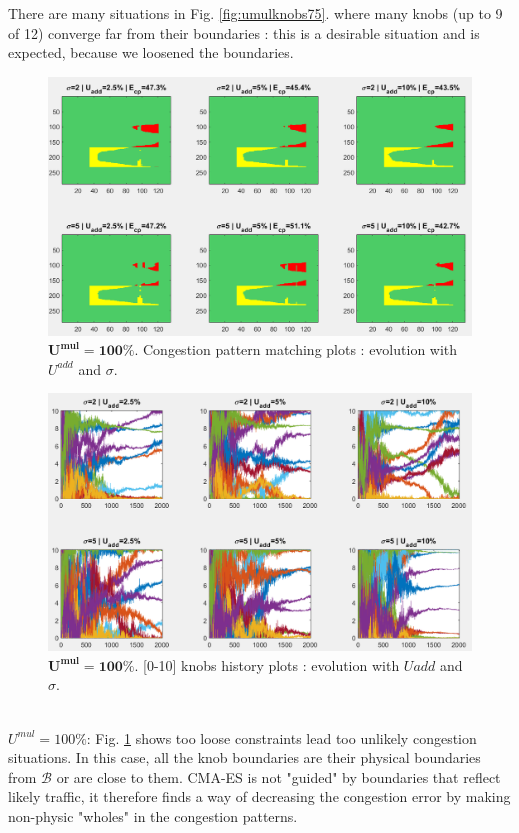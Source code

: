 There are many situations in Fig. \ref{fig:umulknobs75}. where many knobs (up to 9 of 12) converge far from their boundaries : this is a desirable situation and is expected, because we loosened the boundaries.\\
\begin{figure}[!h]
	\label{fig:umulcp100}
	\caption{$\mathbf{U^{mul}=100\%}$. Congestion pattern matching plots : evolution with $U^{add}$ and $\sigma$.}
	\includegraphics[width=7in]{figures/results_figures/Umul/cp_Umul_100_lambda_11.png}
\end{figure}
\begin{figure}[!h]
	\label{fig:umulknobs100}
	\caption{$\mathbf{U^{mul}=100\%}$. [0-10] knobs history plots : evolution with $U{add}$ and $\sigma$.}
	\includegraphics[width=7in]{figures/results_figures/Umul/knobs_Umul_100_lambda_11.png}
\end{figure}	
\\
\emph{$U^{mul}=100\% $}: Fig. \ref{fig:umulcp100} shows too loose constraints lead too unlikely congestion situations. In this case, all the knob boundaries are their physical boundaries from $\mathscr{B}$ or are close to them. CMA-ES is not "guided" by boundaries that reflect likely traffic, it therefore finds a way of decreasing the congestion error by making non-physic "wholes" in the congestion patterns.\\
